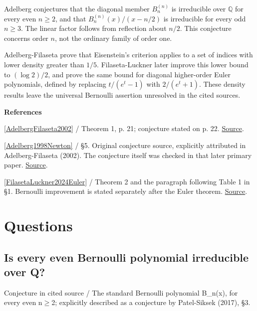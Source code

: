 \documentclass[11pt,a4paper,oneside,openany]{book}
\newcommand{\atlasdisplay}[1]{\par\begingroup\centering\vspace{3pt}\noindent\adjustbox{max width=\linewidth}{\(\displaystyle #1\)}\par\vspace{5pt}\endgroup}
\newenvironment{sources}{\par\smallskip\begingroup\footnotesize\color{atlasgray}\leftskip=10pt\setlength{\parskip}{2pt}}{\par\endgroup\smallskip}
\begin{document}
\atlasdisplay{\left(\frac{t}{e^t-1}\right)^r e^{xt}=\sum_{n\ge0}B_n^{(r)}(x)\frac{t^n}{n!}.}
\color{black} Adelberg conjectures that the diagonal member \(B_n^{(n)}\) is irreducible over \(\mathbb Q\) for every even \(n\ge2\), and that \(B_n^{(n)}(x)/(x-n/2)\) is irreducible for every odd \(n\ge3\). The linear factor follows from reflection about \(n/2\). This conjecture concerns order \(n\), not the ordinary family of order one.\par
\color{black} Adelberg-Filaseta prove that Eisenstein's criterion applies to a set of indices with lower density greater than \(1/5\). Filaseta-Luckner later improve this lower bound to \((\log 2)/2\), and prove the same bound for diagonal higher-order Euler polynomials, defined by replacing \(t/(e^t-1)\) with \(2/(e^t+1)\). These density results leave the universal Bernoulli assertion unresolved in the cited sources.\par
\begin{sources}
\textbf{References}\par\smallskip
\noindent\hyperlink{ref:AdelbergFilaseta2002}{[AdelbergFilaseta2002]} / Theorem 1, p. 21; conjecture stated on p. 22.  \href{https://www.impan.pl/shop/en/publication/transaction/download/product/87393}{Source}.\par
\noindent\hyperlink{ref:Adelberg1998Newton}{[Adelberg1998Newton]} / §5. Original conjecture source, explicitly attributed in Adelberg-Filaseta (2002). The conjecture itself was checked in that later primary paper. \href{https://link.springer.com/chapter/10.1007/978-94-011-5020-0_1}{Source}.\par
\noindent\hyperlink{ref:FilasetaLuckner2024Euler}{[FilasetaLuckner2024Euler]} / Theorem 2 and the paragraph following Table 1 in §1. Bernoulli improvement is stated separately after the Euler theorem. \href{https://arxiv.org/abs/2305.09227}{Source}.\par
\end{sources}\color{black}
\section*{Questions}
\subsection*{Is every even Bernoulli polynomial irreducible over Q?}
{\small\sffamily\color{atlasgold}Conjecture in cited source / The standard Bernoulli polynomial B\_\allowbreak{}n(x), for every even n\ensuremath{\ge}2; explicitly described as a conjecture by Patel-Siksek (2017), §3.}\par\smallskip
\end{document}
